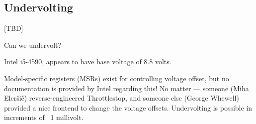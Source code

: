 \subsection{Undervolting}

[TBD]

Can we undervolt?

Intel i5-4590, appears to have base voltage of 8.8 volts.

Model-specific registers (MSRs) exist for controlling voltage offset, but no
documentation is provided by Intel regarding this!
No matter — someone (Miha Eleršič) reverse-engineered Throttlestop, and someone
else (George Whewell) provided a nice frontend to change the voltage offsets.
Undervolting is possible in increments of ~1 millivolt.
